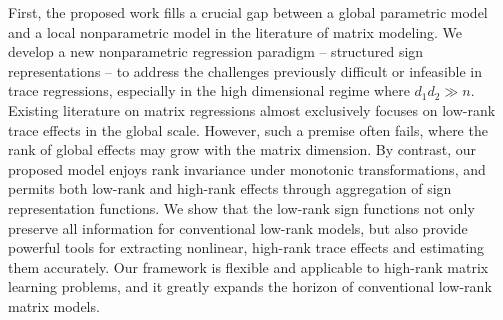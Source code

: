 \documentclass[aos]{imsart}
\theoremstyle{definition}
\begin{document}
First, the proposed work fills a crucial gap between a global parametric model and a local nonparametric model in the literature of matrix modeling. We develop a new nonparametric regression paradigm -- structured sign representations -- to address the challenges previously difficult or infeasible in trace regressions, especially in the high dimensional regime where $d_1d_2\gg n$. Existing literature on matrix regressions almost exclusively focuses on low-rank trace effects in the global scale. However, such a premise often fails, where the rank of global effects may grow with the matrix dimension. By contrast, our proposed model enjoys rank invariance under monotonic transformations, and permits both low-rank and high-rank effects through aggregation of sign representation functions. We show that the low-rank sign functions not only preserve all information for conventional low-rank models, but also provide powerful tools for extracting nonlinear, high-rank trace effects and estimating them accurately. Our framework is flexible and applicable to high-rank matrix learning problems, and it greatly expands the horizon of conventional low-rank matrix models.
\end{document}

